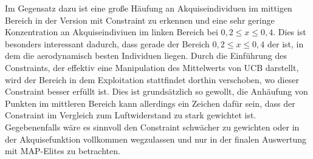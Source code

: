 Im Gegensatz dazu ist eine große Häufung an Akquiseindividuen im mittigen Bereich in der Version mit Constraint zu erkennen
und eine sehr geringe Konzentration an Akquiseindiviuen im linken Bereich bei $0,2 \leq x \leq 0,4$.
Dies ist besonders interessant dadurch, dass gerade der Bereich $0,2 \leq x \leq 0,4$ der ist, in dem die aerodynamisch besten Individuen liegen.
Durch die Einführung des Constraints, der effektiv eine Manipulation des Mittelwerts von UCB darstellt, wird der Bereich in dem Exploitation stattfindet dorthin verschoben, wo dieser Constraint besser erfüllt ist.
Dies ist grundsätzlich so gewollt, die Anhäufung von Punkten im mittleren Bereich kann allerdings ein Zeichen dafür sein, dass der Constraint im Vergleich zum Luftwiderstand zu stark gewichtet ist.
Gegebenenfalls wäre es sinnvoll den Constraint schwächer zu gewichten oder in der Akquisefunktion vollkommen wegzulassen und nur in der finalen Auswertung mit MAP-Elites zu betrachten.

\newcommand{\wheelcasepheno}[1]{
	\begin{figure}[h]
		\centering
		\begin{subfigure}[t]{0.5\textwidth}
			\centering
			\texttt{[image: bilder/6pt1000Samples/\#1-uncon-top.png]}
			\subcaption{oben, ohne Constraint}
		\end{subfigure}\hfill
		\begin{subfigure}[t]{0.5\textwidth}
			\centering
			\texttt{[image: bilder/6pt1000Samples/\#1-uncon-angled.png]}
			\subcaption{perspektivisch, ohne Constraint}
		\end{subfigure}
		\begin{subfigure}[b]{0.5\textwidth}
			\centering
			\texttt{[image: bilder/6pt1000Samples/\#1-con-top.png]}
			\subcaption{oben, mit Constraint}
		\end{subfigure}\hfill
		\begin{subfigure}[b]{0.5\textwidth}
			\centering
			\texttt{[image: bilder/6pt1000Samples/\#1-con-angled.png]}
			\subcaption{perspektivisch, mit Constraint}
		\end{subfigure}
		\caption{Die Phänotypen des Individuums (#1) mit und ohne Constraint}
		\label{wheelcasepheno#1}
	\end{figure}
}

\newcommand{\wref}[1]{
	\cref{fig:wheelcasepheno#1}
}


